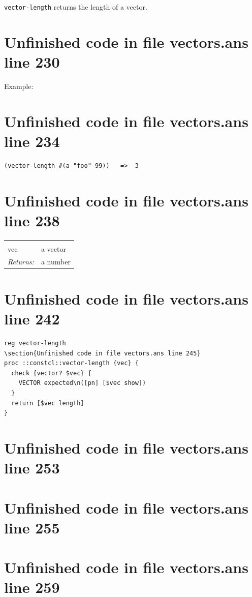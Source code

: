 \documentclass[twoside,9pt]{report}
\begin{document}
\texttt{vector-length} returns the length of a vector.

\section{Unfinished code in file vectors.ans line 230}


Example:

\section{Unfinished code in file vectors.ans line 234}
\begin{verbatim}
(vector-length #(a "foo" 99))   =>  3
\end{verbatim}
\section{Unfinished code in file vectors.ans line 238}
\noindent\begin{tabular}{ |p{1.9cm} p{8cm}| }
\hline
\rowcolor[HTML]{CCCCCC} \multicolumn{2}{|l|}{\bf vector-length (public)} \\
vec & a vector \\
\textit{Returns:} & a number \\
\hline
\end{tabular}
\section{Unfinished code in file vectors.ans line 242}
\begin{lstlisting}
reg vector-length
\section{Unfinished code in file vectors.ans line 245}
proc ::constcl::vector-length {vec} {
  check {vector? $vec} {
    VECTOR expected\n([pn] [$vec show])
  }
  return [$vec length]
}
\end{lstlisting}
\section{Unfinished code in file vectors.ans line 253}
\section{Unfinished code in file vectors.ans line 255}
\section{Unfinished code in file vectors.ans line 259}
\end{document}
